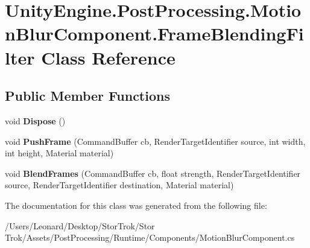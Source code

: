 \hypertarget{class_unity_engine_1_1_post_processing_1_1_motion_blur_component_1_1_frame_blending_filter}{}\section{Unity\+Engine.\+Post\+Processing.\+Motion\+Blur\+Component.\+Frame\+Blending\+Filter Class Reference}
\label{class_unity_engine_1_1_post_processing_1_1_motion_blur_component_1_1_frame_blending_filter}
\subsection*{Public Member Functions}
\begin{DoxyCompactItemize}
\item 
\mbox{\label{class_unity_engine_1_1_post_processing_1_1_motion_blur_component_1_1_frame_blending_filter_a65d54ba8a2c251750ae6f0b24b820dea}} 
void {\bfseries Dispose} ()
\item 
\mbox{\label{class_unity_engine_1_1_post_processing_1_1_motion_blur_component_1_1_frame_blending_filter_a28f61022ba58cd83c34e46a2511c32ed}} 
void {\bfseries Push\+Frame} (Command\+Buffer cb, Render\+Target\+Identifier source, int width, int height, Material material)
\item 
\mbox{\label{class_unity_engine_1_1_post_processing_1_1_motion_blur_component_1_1_frame_blending_filter_a679383bc1fc3e5e698bb5724676efcc5}} 
void {\bfseries Blend\+Frames} (Command\+Buffer cb, float strength, Render\+Target\+Identifier source, Render\+Target\+Identifier destination, Material material)
\end{DoxyCompactItemize}


The documentation for this class was generated from the following file\+:\begin{DoxyCompactItemize}
\item 
/\+Users/\+Leonard/\+Desktop/\+Stor\+Trok/\+Stor Trok/\+Assets/\+Post\+Processing/\+Runtime/\+Components/Motion\+Blur\+Component.\+cs\end{DoxyCompactItemize}

